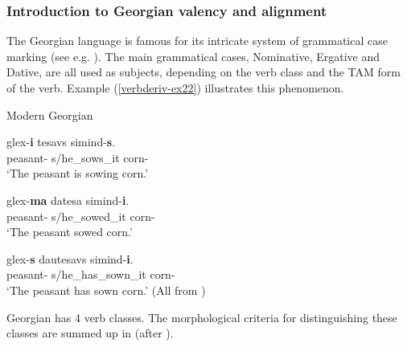 \subsubsection{Introduction to Georgian valency and alignment} \label{geoalign}

The Georgian language is famous for its intricate system of grammatical case marking (see e.g. \cites[]{harris1982unaccusative,harris1981syntax}). The main grammatical cases, Nominative, Ergative and Dative, are all used as subjects, depending on the verb class and the TAM form of the verb. Example (\ref{verbderiv-ex22}) illustrates this phenomenon. 

\begin{exe}
	\ex\label{verbderiv-ex22}
	Modern Georgian
	\begin{xlist}
		
		
			\ex\label{verbderiv-ex22a}
			\gll  glex-\textbf{i} tesavs simind-\textbf{s}. \\
			peasant-\textbf{{\Nom}} s/he\_sows\_it  corn-\textbf{{\Dat}} \\
			\trans `The peasant is sowing corn.'
			\hfill
		
		
		
			\ex\label{verbderiv-ex22b}
			\gll  glex-\textbf{ma} datesa simind-\textbf{i}. \\
			peasant-\textbf{{\Erg}} s/he\_sowed\_it corn-\textbf{{\Nom}} \\
			\trans `The peasant sowed corn.'
			\hfill 
		
		
		
			\ex\label{verbderiv-ex22c}
			\gll glex-\textbf{s} dautesavs simind-\textbf{i}. \\
			peasant-\textbf{{\Dat}} s/he\_has\_sown\_it corn-\textbf{{\Nom}}\\
			\trans `The peasant has sown corn.'
			\hfill (All from \cites[1]{harris1981syntax})
		
		
	\end{xlist}
\end{exe}


Georgian has 4 verb classes. The morphological criteria for distinguishing these classes are summed up in  (after \cites[260]{harris1981syntax}).

